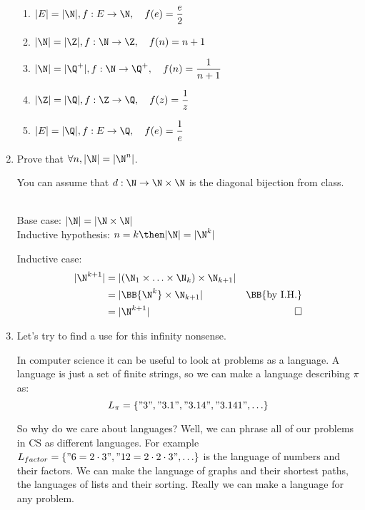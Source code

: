 \documentclass[basic, header]{nosvagor-notes}
\begin{document}
\begin{enumerate}[itemsep=4em]
\begin{enumerate}[leftmargin=2em]
      \item \(\displaystyle |E| = |\N|, f: E \to \N, \quad f(e) = \frac{e}{2} \)

      \item \(\displaystyle |\N| = |\Z|, f: \N \to \Z, \quad f(n) = n+1\)

      \item \(\displaystyle |\N| = |\Q^+|, f: \N \to \Q^+, \quad f(n) = \frac{1}{n+1}\)

      \item \(\displaystyle |\Z| = |\Q|, f: \Z \to \Q, \quad f(z) = \frac{1}{z}\)

      \item \(\displaystyle |E| = |\Q|, f: E \to \Q, \quad f(e) = \frac{1}{e}\)

    \end{enumerate}

  \newpage %

  \item Prove that \(\displaystyle \forall n, |\N| = |\N^n|\).

    You can assume that \(d : \N \to \N \times \N\) is the diagonal bijection
    from class.

    \\
    Base case: \(|\N| = |\N \times \N|\)  \\
    Inductive hypothesis: \(\displaystyle
    n=k
    \then
    |\N| = |\N^k|
    \)

    Inductive case:
    \begin{align*}
      |\N^{k+1}   |
      &= |(\N_1 \times \ldots  \times \N_k) \times \N_{k+1}  |  \\
      &= |\BB{\N^k} \times \N_{k+1} | & \text{\BB{by I.H.}} \\
      &= |\N^{k+1} |
      & \qed
    \end{align*}

  \item Let's try to find a use for this infinity nonsense.

    In computer science it can be useful to look at problems as a language. A
    language is just a set of finite strings, so we can make a language
    describing $\pi$ as: \[L_\pi = \{"3", "3.1", "3.14", "3.141", \ldots\}\]

    So why do we care about languages?
    Well, we can phrase all of our problems in CS as different languages.
    For example $L_{factor} = \{"6=2\cdot3", "12=2\cdot2\cdot3", \ldots\}$
    is the language of numbers and their factors. We can make the language of
    graphs and their shortest paths, the languages of lists
    and their sorting. Really we can make a language for any problem.


\end{enumerate}
\end{document}
